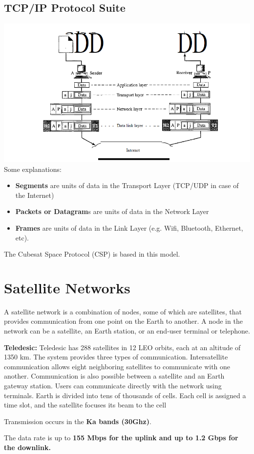 \documentclass[12pt,a4paper]{report}
\begin{document}
\subsection{TCP/IP Protocol Suite}
\includegraphics[scale=0.7]{ip_tcp} \newline
Some explanations:
\begin{itemize}
\item \textbf{Segments} are units of data in the Transport Layer (TCP/UDP in case of the Internet)
\item \textbf{Packets or Datagram}s are units of data in the Network Layer 
\item\textbf{ Frames} are units of data in the Link Layer (e.g. Wifi, Bluetooth, Ethernet, etc).

\end{itemize}
The Cubesat Space Protocol (CSP) is based in this model.
\section{Satellite Networks}
\paragraph{}A satellite network is a combination of nodes, some of which are satellites, that provides communication from one point on the Earth to another. A node in the network can be a satellite, an Earth station, or an end-user terminal or telephone.\newline

\textbf{Teledesic:}
Teledesic has 288 satellites in 12 LEO orbits, each at an altitude of 1350 km.
The system provides three types of communication. Intersatellite communication allows eight neighboring satellites to communicate with one another. Communication is also possible between a satellite and an Earth gateway station. Users can communicate directly with the network using terminals. Earth is divided into tens of thousands of cells. Each cell is assigned a time slot, and the satellite focuses its beam to the cell\newline

Transmission occurs in the \textbf{Ka bands (30Ghz)}.\newline

The data rate is up to \textbf{155 Mbps for the uplink and up to 1.2 Gbps for the downlink.}
\end{document}
